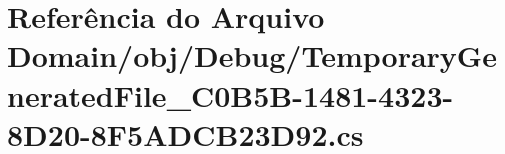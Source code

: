 \hypertarget{Domain_2obj_2Debug_2TemporaryGeneratedFile__036C0B5B-1481-4323-8D20-8F5ADCB23D92_8cs}{}\section{Referência do Arquivo Domain/obj/\+Debug/\+Temporary\+Generated\+File\+\_\+C0\+B5\+B-\/1481-\/4323-\/8\+D20-\/8\+F5\+A\+D\+C\+B23\+D92.cs}
\label{Domain_2obj_2Debug_2TemporaryGeneratedFile__036C0B5B-1481-4323-8D20-8F5ADCB23D92_8cs}
